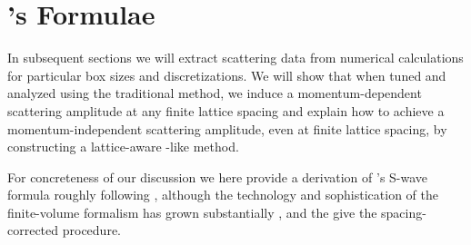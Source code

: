 \section{\Luscher's Formulae}\label{sec:luescher}

In subsequent sections we will extract scattering data from numerical calculations for particular box sizes and discretizations.
We will show that when tuned and analyzed using the traditional \Luscher method, we induce a momentum-dependent scattering amplitude at any finite lattice spacing and explain how to achieve a momentum-independent scattering amplitude, even at finite lattice spacing, by constructing a lattice-aware \Luscher-like method.

For concreteness of our discussion we here provide a derivation of \Luscher's S-wave formula roughly following , although the technology and sophistication of the finite-volume formalism has grown substantially \cite{Zhu:2019dho}, and the give the spacing-corrected procedure.



